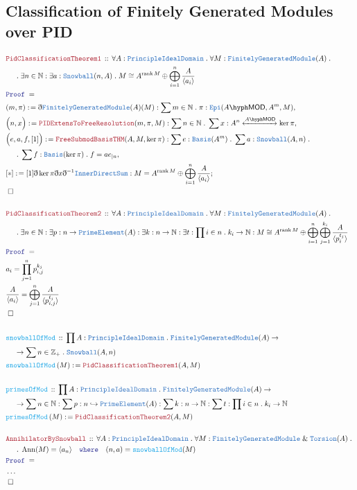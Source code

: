 \documentclass[12pt]{scrartcl}
\newcommand{\TYPE}[1]{\textcolor{NavyBlue}{\mathtt{#1}}}
\newcommand{\FUNC}[1]{\textcolor{Cerulean}{\mathtt{#1}}}
\newcommand{\LOGIC}[1]{\textcolor{Blue}{\mathtt{#1}}}
\newcommand{\THM}[1]{\textcolor{Maroon}{\mathtt{#1}}}
\renewcommand{\.}{\; . \;}
\newcommand{\de}{: \kern 0.1pc =}
\newcommand{\where}{\LOGIC{where}}
\newcommand{\Act}[1]{\left(#1\right)}
\newcommand{\Theorem}[2]{& \THM{#1} \, :: \, #2 \\ & \Proof = \\ }
\newcommand{\DeclareFunc}[2]{& \FUNC{#1} \, :: \, #2 \\}
\newcommand{\DefineFunc}[3]{&  \FUNC{#1}\Act{#2} \de #3 \\}
\newcommand{\NewLine}{\\ & \kern 1pc}
\newcommand{\Page}[1]{ \begin{align*} #1 \end{align*}   }
\newcommand{ \bd }{ \ByDef }
\newcommand{\NoProof}{ & \ldots \\ \EndProof}
\renewcommand{\And}{\; \& \;}
\newcommand{\Int}{\mathbb{Z} }
\newcommand{\Nat}{\mathbb{N} }
\newcommand{\ToInj}{\hookrightarrow}
\newcommand{\Say}[3]{& #1 \de #2 : #3, \\}
\newcommand{\Conclude}[3]{& #1 \de #2 : #3; \\}
\newcommand{\QED}{\; \square}
\newcommand{\EndProof}{& \QED \\}
\newcommand{\ByDef}{\eth}
\newcommand{\Proof}{\LOGIC{Proof} \; }
\newcommand{\ToIso}[1]{\xleftrightarrow{#1}}
\DeclareMathOperator{\rank}{rank}
\newcommand{\FGM}{\TYPE{FinitelyGeneratedModule}}
\DeclareMathOperator{\Ann}{Ann}
\newcommand{\LMOD}[1]{#1\hyph\mathsf{MOD}}
\newcommand{\PID}{\TYPE{PrincipleIdealDomain}}
\begin{document}
\subsection{Classification of Finitely Generated Modules over PID}
\Page{
	\Theorem{PidClassificationTheorem1}{
		\forall A : \PID \. \forall M : \FGM(A) \. \NewLine \.  \exists n \in \Nat  : \exists a :  \TYPE{Snowball}(n,A) \.
		M \cong A^{\rank M} \oplus \bigoplus^n_{i=1} \frac{A}{\langle a_i \rangle}
	}
	\Say{(m,\pi)}{\bd \FGM(A)(M)}{\sum m \in \Nat \.  \pi : \TYPE{Epi}(\LMOD{A},A^m,M)}
	\Say{\Big(n,x\Big)}{\THM{PIDExtensToFreeResolution}(m,\pi,M)}{\sum n \in \Nat \. \sum x :A^n \ToIso{\LMOD{A}} \ker \pi}
	\Say{\Big(e,a,f,[1]\Big)}{\THM{FreeSubmodBasisTHM}(A,M,\ker \pi)}
	{
		\sum e : \TYPE{Basis}(A^m) \. \sum a : \TYPE{Snowball}(A,n) \. 
		\NewLine \. \sum f : \TYPE{Basis}(\ker \pi) \.
		 f = ae_{|n} 
	}
	\Conclude{[*]}{[1]\bd \ker \pi \bd x\bd^{-1} \TYPE{InnerDirectSum}}
	{ M = A^{\rank M} \oplus \bigoplus^n_{i=1} \frac{A}{\langle a_i\rangle} }
	\EndProof
	\\
	\Theorem{PidClassificationTheorem2}{
		\forall A : \PID \. \forall M : \FGM(A) \. \NewLine \.  \exists n \in \Nat  : 
		\exists p : n \to \TYPE{PrimeElement}(A) : \exists k : n \to \Nat : \exists t : \prod i \in n \. k_i \to \Nat :  
		M \cong A^{\rank M} \oplus \bigoplus^{n}_{i=1}\bigoplus^{k_i}_{j=1} \frac{A}{\langle p_i^{t_j} \rangle}
	}
	& a_i = \prod^n_{j=1} p^{k_j}_{i,j} \\
	&  \frac{A}{\langle a_i \rangle} = \bigoplus^n_{j=1} \frac{A}{\langle p^{t_j}_{i,j}\rangle}\\
	\EndProof
	\\
	\DeclareFunc{snowballOfMod}{ \prod A : \PID \. \FGM(A) \to \NewLine \to \sum n \in \Int_+ \.  \TYPE{Snowball}(A,n) }
	\DefineFunc{snowballOfMod}{M}{\THM{PidClassificationTheorem1}(A,M)}
	\\
	\DeclareFunc{primesOfMod}{\prod A : \PID \. \FGM(A) \to \NewLine \to \sum n \in \Nat  : 
		\sum p : n \ToInj \TYPE{PrimeElement}(A) : \sum k : n \to \Nat : \sum t : \prod i \in n \. k_i \to \Nat }
	\DefineFunc{primesOfMod}{M}{\THM{PidClassificationTheorem2}(A,M)}
	\\
	\Theorem{AnnihilatorBySnowball}{\forall A : \PID \. \forall M : \FGM \And \TYPE{Torsion}(A) \. 
		\NewLine \. \Ann(M) = \langle a_n \rangle  \quad \where \quad (n,a) = \FUNC{snowballOfMod}(M)  }
	\NoProof
}
\newpage
\end{document}
